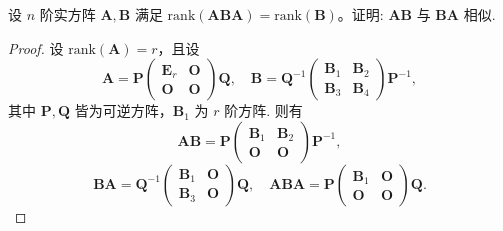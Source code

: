 \documentclass[../../main.tex]{subfiles}%
\begin{document}
\begin{example}
设 \( n \) 阶实方阵 \( \boldsymbol{A},\boldsymbol{B} \) 满足 \( \mathrm{rank}(\boldsymbol{ABA}) = \mathrm{rank}(\boldsymbol{B}) \)。证明: \( \boldsymbol{AB} \) 与 \( \boldsymbol{BA} \) 相似.
\end{example}
\begin{proof}

设 \( \mathrm{rank}(\boldsymbol{A}) = r \)，且设
\[
\boldsymbol{A} = \boldsymbol{P} \begin{pmatrix} \boldsymbol{E}_r & \boldsymbol{O} \\ \boldsymbol{O} & \boldsymbol{O} \end{pmatrix} \boldsymbol{Q}, \quad \boldsymbol{B} = \boldsymbol{Q}^{-1} \begin{pmatrix} \boldsymbol{B}_1 & \boldsymbol{B}_2 \\ \boldsymbol{B}_3 & \boldsymbol{B}_4 \end{pmatrix} \boldsymbol{P}^{-1},
\]
其中 \( \boldsymbol{P},\boldsymbol{Q} \) 皆为可逆方阵，\( \boldsymbol{B}_1 \) 为 \( r \) 阶方阵. 则有
\[
\boldsymbol{AB} = \boldsymbol{P} \begin{pmatrix} \boldsymbol{B}_1 & \boldsymbol{B}_2 \\ \boldsymbol{O} & \boldsymbol{O} \end{pmatrix} \boldsymbol{P}^{-1},
\]
\[
\boldsymbol{BA} = \boldsymbol{Q}^{-1} \begin{pmatrix} \boldsymbol{B}_1 & \boldsymbol{O} \\ \boldsymbol{B}_3 & \boldsymbol{O} \end{pmatrix} \boldsymbol{Q}, \quad \boldsymbol{ABA} = \boldsymbol{P} \begin{pmatrix} \boldsymbol{B}_1 & \boldsymbol{O} \\ \boldsymbol{O} & \boldsymbol{O} \end{pmatrix} \boldsymbol{Q}.
\]


\end{proof}
\end{document}
